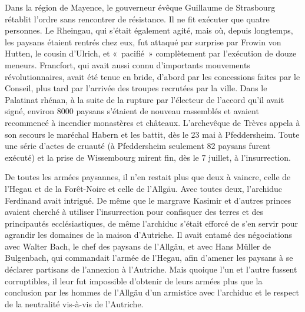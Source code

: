 \documentclass[french,twoside]{book} %
\begin{document}
Dans la région de Mayence, le gouverneur évêque Guillaume de Strasbourg rétablit l’ordre sans rencontrer de résistance. Il ne fit exécuter que quatre personnes. Le Rheingau, qui s’était également agité, mais où, depuis longtemps, les paysans étaient rentrés chez eux, fut attaqué par surprise par Frowin von Hutten, le cousin d’Ulrich, et « pacifié » complètement par l’exécution de douze meneurs. Francfort, qui avait aussi connu d’importants mouvements révolutionnaires, avait été tenue en bride, d’abord par les concessions faites par le Conseil, plus tard par l’arrivée des troupes recrutées par la ville. Dans le Palatinat rhénan, à la suite de la rupture par l’électeur de l’accord qu’il avait signé, environ 8000 paysans s’étaient de nouveau rassemblés et avaient recommencé à incendier monastères et châteaux. L’archevêque de Trèves appela à son secours le maréchal Habern et les battit, dès le 23 mai à Pfeddersheim. Toute une série d’actes de cruauté (à Pfeddersheim seulement 82 paysans furent exécuté) et la prise de Wissembourg mirent fin, dès le 7 juillet, à l’insurrection.\par
De toutes les armées paysannes, il n’en restait plus que deux à vaincre, celle de l’Hegau et de la Forêt-Noire et celle de l’Allgäu. Avec toutes deux, l’archiduc Ferdinand avait intrigué. De même que le margrave Kasimir et d’autres princes avaient cherché à utiliser l’insurrection pour confisquer des terres et des principautés ecclésiastiques, de même l’archiduc s’était efforcé de s’en servir pour agrandir les domaines de la maison d’Autriche. Il avait entamé des négociations avec Walter Bach, le chef des paysans de l’Allgäu, et avec Hans Müller de Bulgenbach, qui commandait l’armée de l’Hegau, afin d’amener les paysans à se déclarer partisans de l’annexion à l’Autriche. Mais quoique l’un et l’autre fussent corruptibles, il leur fut impossible d’obtenir de leurs armées plus que la conclusion par les hommes de l’Allgäu d’un armistice avec l’archiduc et le respect de la neutralité vis-à-vis de l’Autriche.\par
\end{document}
